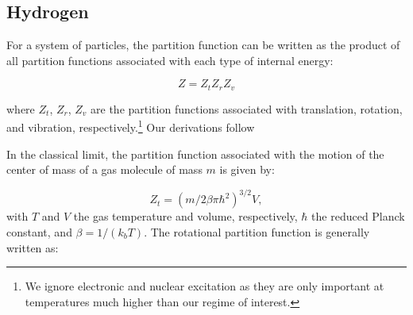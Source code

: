 \documentclass[apj]{emulateapj}
\begin{document}

\subsection{Hydrogen}

\label{hydrogen}

For a system of particles, the partition function can be written as the product of all partition functions associated with each type of internal energy:


\begin{equation}
\label{eq:zagain}
Z=Z_t Z_r Z_v
\end{equation} 

\noindent where $Z_t$, $Z_r$, $Z_v$ are the partition functions associated with translation, rotation, and vibration, respectively.\footnote{We ignore electronic and nuclear excitation as they are only important at temperatures much higher than our regime of interest.} Our derivations follow \citet{kittel} %


In the classical limit, the partition function associated with the motion of the center of mass of a gas molecule of mass $m$ is given by:

\begin{equation}
\label{eq:Zt}
Z_t=(m/2 \beta \pi \hbar^2)^{3/2} V,
\end{equation}
with  $T$ and $V$ the gas temperature and volume, respectively, $\hbar$ the reduced Planck constant, and  $\beta=1/(k_b T)$. The rotational partition function is generally written as:
\end{document}
